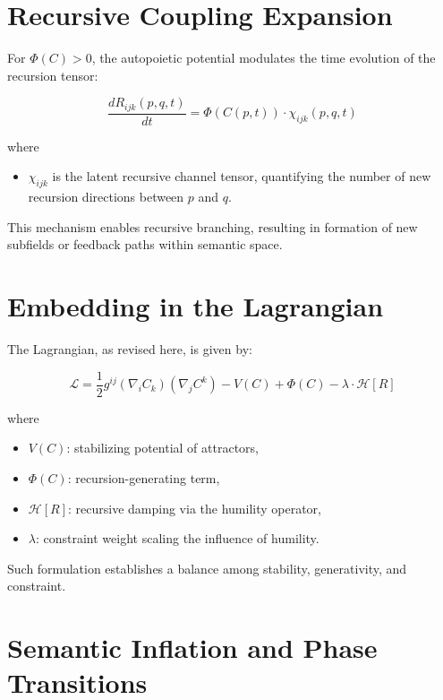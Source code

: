 \section{Recursive Coupling Expansion}

For \(\Phi(C) > 0\), the autopoietic potential modulates the time evolution of the recursion tensor:

\begin{equation}
\frac{dR_{ijk}(p,q,t)}{dt} = \Phi(C(p,t)) \cdot \chi_{ijk}(p,q,t)
\end{equation}

where

\begin{itemize}
    \item \(\chi_{ijk}\) is the latent recursive channel tensor, quantifying the number of new recursion directions between \(p\) and \(q\).
\end{itemize}

This mechanism enables recursive branching, resulting in formation of new subfields or feedback paths within semantic space.

\section{Embedding in the Lagrangian}

The Lagrangian, as revised here, is given by:

\begin{equation}
\mathcal{L} = \frac{1}{2} g^{ij} (\nabla_i C_k)(\nabla_j C^k) - V(C) + \Phi(C) - \lambda \cdot \mathcal{H}[R]
\end{equation}

where

\begin{itemize}
    \item \(V(C)\): stabilizing potential of attractors,
    \item \(\Phi(C)\): recursion-generating term,
    \item \(\mathcal{H}[R]\): recursive damping via the humility operator,
    \item \(\lambda\): constraint weight scaling the influence of humility.
\end{itemize}

Such formulation establishes a balance among stability, generativity, and constraint.

\section{Semantic Inflation and Phase Transitions}


